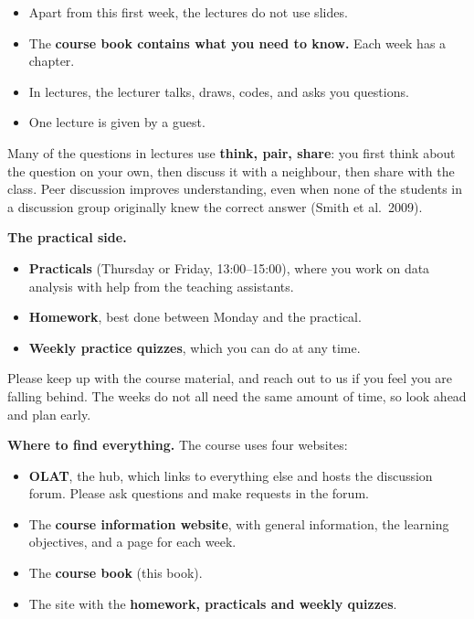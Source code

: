 \documentclass[
  letterpaper,
  8pt,
  a4paper]{book}
\newcounter{none} %
\providecommand{\tightlist}{%
  \setlength{\itemsep}{0pt}\setlength{\parskip}{0pt}}
\begin{document}
\begin{itemize}
\tightlist
\item
  Apart from this first week, the lectures do not use slides.
\item
  The \textbf{course book contains what you need to know.} Each week has
  a chapter.
\item
  In lectures, the lecturer talks, draws, codes, and asks you questions.
\item
  One lecture is given by a guest.
\end{itemize}

Many of the questions in lectures use \textbf{think, pair, share}: you
first think about the question on your own, then discuss it with a
neighbour, then share with the class. Peer discussion improves
understanding, even when none of the students in a discussion group
originally knew the correct answer (Smith et al.~2009).

\textbf{The practical side.}

\begin{itemize}
\tightlist
\item
  \textbf{Practicals} (Thursday or Friday, 13:00--15:00), where you work
  on data analysis with help from the teaching assistants.
\item
  \textbf{Homework}, best done between Monday and the practical.
\item
  \textbf{Weekly practice quizzes}, which you can do at any time.
\end{itemize}

Please keep up with the course material, and reach out to us if you feel
you are falling behind. The weeks do not all need the same amount of
time, so look ahead and plan early.

\textbf{Where to find everything.} The course uses four websites:

\begin{itemize}
\tightlist
\item
  \textbf{OLAT}, the hub, which links to everything else and hosts the
  discussion forum. Please ask questions and make requests in the forum.
\item
  The \textbf{course information website}, with general information, the
  learning objectives, and a page for each week.
\item
  The \textbf{course book} (this book).
\item
  The site with the \textbf{homework, practicals and weekly quizzes}.
\end{itemize}
\end{document}
